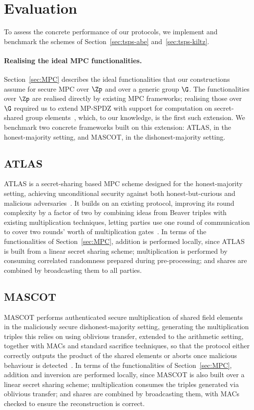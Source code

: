 \section{Evaluation}\label{sec:tsps-evaluation}

To assess the concrete performance of our protocols, we implement and
benchmark the schemes of Section~\ref{sec:tsps-abe} and~\ref{sec:tsps-kiltz}.

\paragraph{Realising the ideal MPC functionalities.} Section~\ref{sec:MPC}
describes the ideal functionalities that our constructions assume for secure
MPC over $\Zp$ and over a generic group $\G$. The functionalities over $\Zp$
are realised directly by existing MPC frameworks; realising those over $\G$
required us to extend MP-SPDZ with support for computation on secret-shared
group elements~\cite{CCS:Keller20}, which, to our knowledge, is the first
such extension. We benchmark two concrete frameworks built on this
extension: ATLAS, in the honest-majority setting, and MASCOT, in the
dishonest-majority setting.

\subsection*{ATLAS}\label{sec:ATLAS}

ATLAS is a secret-sharing based MPC scheme designed for the honest-majority
setting, achieving unconditional security against both honest-but-curious
and malicious adversaries~\cite{C:GLOPS21}. It builds on an existing
protocol, improving its round complexity by a factor of two by combining
ideas from Beaver triples with existing multiplication techniques, letting
parties use one round of communication to cover two rounds' worth of
multiplication gates~\cite{C:DamNie07}. In terms of the functionalities of
Section~\ref{sec:MPC}, addition is performed locally, since ATLAS is built
from a linear secret sharing scheme; multiplication is performed by
consuming correlated randomness prepared during pre-processing; and shares
are combined by broadcasting them to all parties.

\subsection*{MASCOT}\label{sec:MASCOT}

MASCOT performs authenticated secure multiplication of shared field elements
in the maliciously secure dishonest-majority setting, generating the
multiplication triples this relies on using oblivious transfer, extended to
the arithmetic setting, together with MACs and standard sacrifice
techniques, so that the protocol either correctly outputs the product of the
shared elements or aborts once malicious behaviour is
detected~\cite{CCS:KelOrsSch16}. In terms of the functionalities of
Section~\ref{sec:MPC}, addition and inversion are performed locally, since
MASCOT is also built over a linear secret sharing scheme; multiplication
consumes the triples generated via oblivious transfer; and shares are
combined by broadcasting them, with MACs checked to ensure the
reconstruction is correct.

